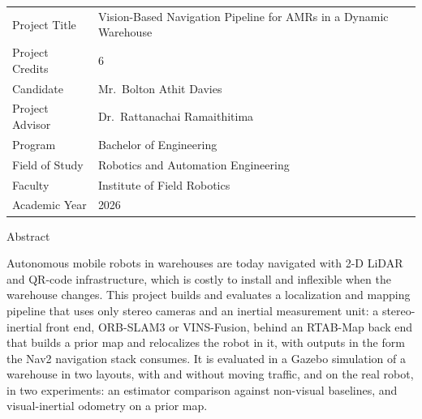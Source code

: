 \thispagestyle{report}
\noindent
\begin{tabular}{@{}p{}p{}@{}}
Project Title & Vision-Based Navigation Pipeline for AMRs in a Dynamic Warehouse \\
Project Credits & 6 \\
Candidate & Mr.\ Bolton Athit Davies \\
Project Advisor & Dr.\ Rattanachai Ramaithitima \\
Program & Bachelor of Engineering \\
Field of Study & Robotics and Automation Engineering \\
Faculty & Institute of Field Robotics \\
Academic Year & 2026 \\
\end{tabular}

\vspace{10mm}
\begin{center}Abstract\end{center}
\vspace{2mm}

Autonomous mobile robots in warehouses are today navigated with 2-D LiDAR and
QR-code infrastructure, which is costly to install and inflexible when the
warehouse changes. This project builds and evaluates a localization and mapping
pipeline that uses only stereo cameras and an inertial measurement unit: a
stereo-inertial front end, ORB-SLAM3 or VINS-Fusion, behind an RTAB-Map back end
that builds a prior map and relocalizes the robot in it, with outputs in the
form the Nav2 navigation stack consumes. It is evaluated in a Gazebo
simulation of a warehouse in two layouts, with and without moving traffic, and
on the real robot, in two experiments: an estimator comparison against
non-visual baselines, and visual-inertial odometry on a prior map.

